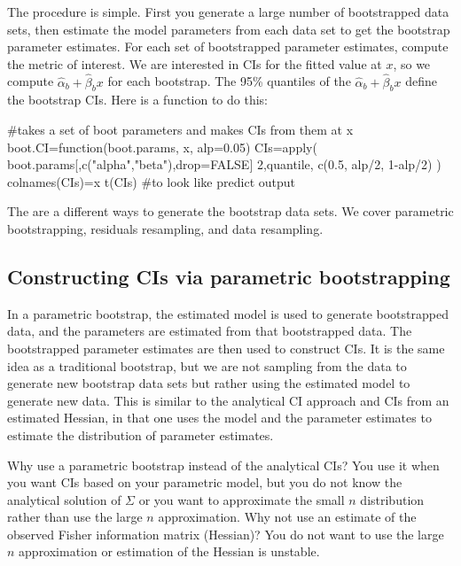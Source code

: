 The procedure is simple.  First you generate a large number of bootstrapped data sets, then estimate the model parameters from each data set to get the bootstrap parameter estimates.  For each set of bootstrapped parameter estimates, compute the metric of interest.  We are interested in CIs for the fitted value at $x$, so we compute $\hat{\alpha}_b + \hat{\beta}_b x$ for each bootstrap.  The 95\% quantiles of the $\hat{\alpha}_b + \hat{\beta}_b x$ define the bootstrap CIs. Here is a function to do this:
\begin{Schunk}
\begin{Sinput}
 #takes a set of boot parameters and makes CIs from them at x
 boot.CI=function(boot.params, x, alp=0.05){
   CIs=apply(
     boot.params[,c("alpha","beta"),drop=FALSE]%*%rbind(1,x),
     2,quantile, c(0.5, alp/2, 1-alp/2) )
   colnames(CIs)=x
   t(CIs) #to look like predict output
 }
\end{Sinput}
\end{Schunk}

The are a different ways to generate the bootstrap data sets.  We cover parametric bootstrapping, residuals resampling, and data resampling.

\subsection{Constructing CIs via parametric bootstrapping }

In a parametric bootstrap, the estimated model is used to generate bootstrapped data, and the parameters are estimated from that bootstrapped data.  The bootstrapped parameter estimates are then used to construct CIs.  It is the same idea as a traditional bootstrap, but we are not sampling from the data to generate new bootstrap data sets but rather using the estimated model to generate new data.  This is similar to the analytical CI approach and CIs from an estimated Hessian, in that one uses the model and the parameter estimates to estimate the distribution of parameter estimates.

Why use a parametric bootstrap instead of the analytical CIs?  You use it when you want CIs based on your parametric model, but you do not know the analytical solution of $\Sigma$ or you want to approximate the small $n$ distribution rather than use the large $n$ approximation.  Why not use  an estimate of the observed Fisher information matrix (Hessian)? You do not want to use the large $n$ approximation or estimation of the Hessian is unstable.

